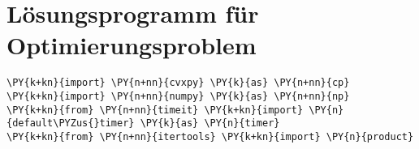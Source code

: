 \section{Lösungsprogramm für Optimierungsproblem}
\label{anhang:section-integer-linear-program}


\renewcommand{\encodingdefault}{OT1}
\renewcommand{\rmdefault}{cmr}
\renewcommand{\sfdefault}{cmss}
\renewcommand{\ttdefault}{cmtt}
\selectfont
\fontsize{10.95}{13.6}\selectfont
\linespread{0.9}\selectfont

\begin{tcolorbox}[breakable, size=fbox, boxrule=1pt, pad at break*=1mm,colback=cellbackground, colframe=cellborder]
    \begin{Verbatim}[commandchars=\\\{\}]
\PY{k+kn}{import} \PY{n+nn}{cvxpy} \PY{k}{as} \PY{n+nn}{cp}
\PY{k+kn}{import} \PY{n+nn}{numpy} \PY{k}{as} \PY{n+nn}{np}
\PY{k+kn}{from} \PY{n+nn}{timeit} \PY{k+kn}{import} \PY{n}{default\PYZus{}timer} \PY{k}{as} \PY{n}{timer}
\PY{k+kn}{from} \PY{n+nn}{itertools} \PY{k+kn}{import} \PY{n}{product}
    \end{Verbatim}
\end{tcolorbox}


